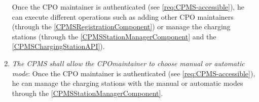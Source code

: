 \begin{enumerate}[label=\textbf{R\arabic*}]
          Once the \ac{CPO} maintainer is authenticated (see \ref{req:CPMS-accessible}), he can execute different operations such as adding other \ac{CPO} maintainers (through the \ref{CPMSRegistrationComponent}) or manage the charging stations (through the \ref{CPMSStationManagerComponent} and the \ref{CPMSChargingStationAPI}).
          \label{req:CPMS-modify-cpo-infos}
    \item \textit{The \ac{CPMS} shall allow the \ac{CPO}maintainer to choose manual or automatic mode}:
          Once the \ac{CPO} maintainer is authenticated (see \ref{req:CPMS-accessible}), he can manage the charging stations with the manual or automatic modes through the \ref{CPMSStationManagerComponent}.
          \label{req:CPMS-select-mode}
\end{enumerate}
\clearpage